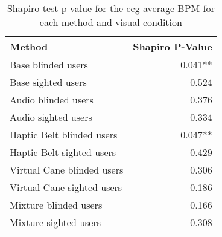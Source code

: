 
\begin{table}[!htb]
\centering
\caption{Shapiro test p-value for the ecg average BPM for each method and visual condition}
\label{tab:shapiro_ecg_bpm}
\begin{tabular}{lr}
\toprule
                    Method & Shapiro P-Value \\
\midrule
        Base blinded users &         0.041** \\
        Base sighted users &           0.524 \\
       Audio blinded users &           0.376 \\
       Audio sighted users &           0.334 \\
 Haptic Belt blinded users &         0.047** \\
 Haptic Belt sighted users &           0.429 \\
Virtual Cane blinded users &           0.306 \\
Virtual Cane sighted users &           0.186 \\
     Mixture blinded users &           0.166 \\
     Mixture sighted users &           0.308 \\
\bottomrule
\end{tabular}
\end{table}

